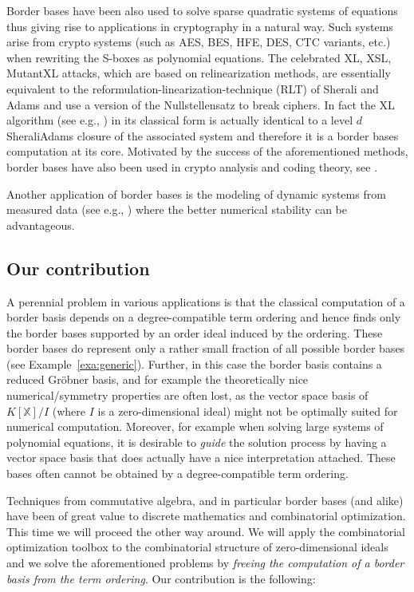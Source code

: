 \documentclass[11pt,oneside,english]{amsart}
\makeatletter
\numberwithin{equation}{section}
\numberwithin{figure}{section}
\theoremstyle{plain}
\theoremstyle{definition}
\theoremstyle{definition}
\theoremstyle{remark}
\theoremstyle{plain}
\theoremstyle{plain}
\theoremstyle{plain}
\theoremstyle{problem@}
\newcounter{problem}
\makeatother
\begin{document}
Border bases have been also used to solve sparse quadratic systems
of equations thus giving rise to applications in cryptography in
a natural way. Such systems arise from crypto systems (such as AES,
BES, HFE, DES, CTC variants, etc.) when rewriting the S-boxes as polynomial
equations. The celebrated XL, XSL, MutantXL attacks, which are based
on relinearization methods, are essentially equivalent to the reformulation-linearization-technique
(RLT) of Sherali and Adams \cite{SA} and use a version of the Nullstellensatz
to break ciphers. In fact the XL algorithm (see e.g., \cite{kreuzerAlgAttack,courtois2000eas})
in its classical form is actually identical to a level $d$ Sherali\textendash Adams
closure of the associated system and therefore it is a border bases computation
at its core. Motivated by the success of the aforementioned methods,
border bases have also been used in crypto analysis and coding theory, see
\cite{borgesquintana:ams}. 

Another application of border bases is the modeling of dynamic systems
from measured data (see e.g., \cite{HKPP2009, kreuzer2009sbb,
  abbott2008sbb}) where the better numerical stability can be
advantageous.

\subsection*{Our contribution}

A perennial problem in various applications
is that the classical computation of a border basis depends
on a degree-compatible term ordering and
hence finds only the border bases supported
by an order ideal induced by the ordering. These border bases do represent only a rather small fraction of all possible border bases (see Example~\ref{exa:generic}). Further, in this case the border basis contains a reduced
Gröbner basis, and for example the theoretically nice numerical/symmetry properties
are often lost, as the vector space basis of ${K[\mathbb{X}]}/I$ (where
$I$ is a zero-dimensional ideal) might not be optimally suited for
numerical computation.  Moreover, for example when solving large systems
of polynomial equations, it is desirable to \emph{guide} the solution
process by having a vector space basis that does actually have a nice
interpretation attached. These bases often cannot be obtained by a
degree-compatible term ordering. 

Techniques from commutative algebra,
and in particular border bases (and alike) have been of great value
to discrete mathematics and combinatorial optimization. This time
we will proceed the other way around. We will apply the combinatorial optimization
toolbox to the combinatorial structure of zero-dimensional ideals
and we solve the aforementioned problems by \emph{freeing the computation
of a border basis from the term ordering}. Our contribution is the
following:
\end{document}
